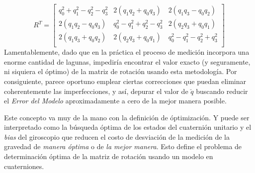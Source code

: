 \documentclass[10pt]{report}
\numberwithin{equation}{chapter}
\numberwithin{algorithm}{chapter}
\begin{document}
\begin{equation}\label{modelo_ecc4}
R^T=\begin{bmatrix} q^2_0+q^2_1-q^2_2-q^2_3&2(q_1q_2+q_0q_3)&2(q_1q_3-q_0q_2)\\ 2(q_1q_2-q_0q_3)&q^2_0-q^2_1+q^2_2-q^2_3&2(q_2q_3+q_0q_1)\\ 2(q_1q_3+q_0q_2)&2(q_2q_3+q_0q_1)&q^2_0-q^2_1-q^2_2+q^2_3\\ \end{bmatrix}
\end{equation} 
Lamentablemente, dado que en la práctica el proceso de medición incorpora una enorme cantidad de lagunas, impediría encontrar el valor exacto (y seguramente, ni siquiera el óptimo) de la matriz de rotación usando esta metodología. Por consiguiente, parece oportuno emplear ciertas correcciones que puedan eliminar coherentemente las imperfecciones, y así, depurar el valor de $\breve{q}$ buscando reducir el \emph{Error del Modelo} aproximadamente a cero de la mejor manera posible.\par
Este concepto va muy de la mano con la definición de óptimización. Y puede ser interpretado como la búsqueda óptima de los estados del cuaternión unitario y el \emph{bias} del giroscopio que reducen el costo de desviación de la medición de la gravedad de \emph{manera óptima} o de \emph{la mejor manera}. Esto define el problema de determinación óptima de la matriz de rotación usando un modelo en cuaterniones.
\end{document}
